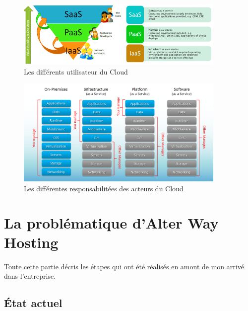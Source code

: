 \subsection*{} %

\begin{figure}[H]
\centering
\includegraphics[width=0.9\textwidth]{resource/img/clouds-users}
\caption{Les différents utilisateur du Cloud}
\end{figure}

\begin{figure}[H]
\centering
\includegraphics[width=0.9\textwidth]{resource/img/clouds-responsabilities}
\caption{Les différentes responsabilitées des acteurs du Cloud}
\end{figure}

\section{La problématique d'Alter Way Hosting}

\paragraph*{}
Toute cette partie décris les étapes qui ont été réalisés en amont de mon arrivé dans l'entreprise.

\subsection{État actuel}
